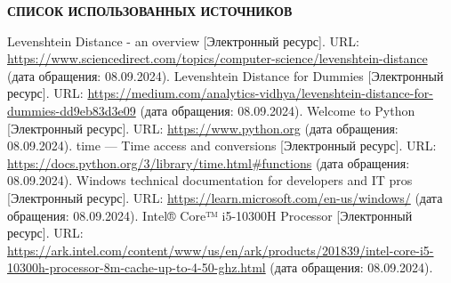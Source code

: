 \renewcommand{\bibname}{}
\begin{thebibliography}{6}
\renewcommand{\bibname}{СПИСОК ИСПОЛЬЗОВАННЫХ ИСТОЧНИКОВ}
\begin{center}
    \textbf{\bibname}
\end{center}
    Levenshtein Distance - an overview [Электронный ресурс]. URL: \url{https://www.sciencedirect.com/topics/computer-science/levenshtein-distance} (дата обращения: 08.09.2024).
	Levenshtein Distance for Dummies [Электронный ресурс]. URL: \url{https://medium.com/analytics-vidhya/levenshtein-distance-for-dummies-dd9eb83d3e09} (дата обращения: 08.09.2024).
	Welcome to Python [Электронный ресурс]. URL: \url{https://www.python.org} (дата обращения: 08.09.2024).
	time — Time access and conversions [Электронный ресурс]. URL: \url{https://docs.python.org/3/library/time.html#functions} (дата обращения: 08.09.2024).
	Windows technical documentation for developers and IT pros [Электронный ресурс]. URL: \url{https://learn.microsoft.com/en-us/windows/} (дата обращения: 08.09.2024).
	Intel® Core™ i5-10300H Processor [Электронный ресурс]. URL: \url{https://ark.intel.com/content/www/us/en/ark/products/201839/intel-core-i5-10300h-processor-8m-cache-up-to-4-50-ghz.html} (дата обращения: 08.09.2024).
\end{thebibliography}